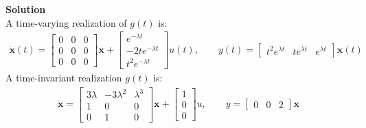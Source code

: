 \documentclass[11pt]{article}
\begin{document}
\begin{enumerate}
{	\textbf{Solution}
	\\
	A time-varying realization of $g(t)$ is:
	\begin{align*}
		\dot{\mathbf{x}}(t)=\left[\begin{array}{ccc}0 & 0 & 0 \\0 & 0 & 0 \\0 & 0 & 0\end{array}\right]\mathbf{x}+\left[\begin{array}{c}e^{-\lambda t} \\-2te^{-\lambda t} \\t^2e^{-\lambda t}\end{array}\right]u(t), \quad \quad y(t)=\left[\begin{array}{ccc}t^2e^{\lambda t} & te^{\lambda t} & e^{\lambda t}\end{array}\right]\mathbf{x}(t)
	\end{align*}
	A time-invariant realization $g(t)$ is:
	\begin{align*}
		\dot{\mathbf{x}}=\left[\begin{array}{ccc}3\lambda & -3\lambda^2 & \lambda^3 \\1 & 0 & 0 \\0 & 1 & 0\end{array}\right]\mathbf{x}+\left[\begin{array}{c}1 \\0 \\0\end{array}\right]u, \quad \quad y=\left[\begin{array}{ccc}0 & 0 & 2\end{array}\right]\mathbf{x}
	\end{align*}
	}
\end{enumerate}
\end{document}

